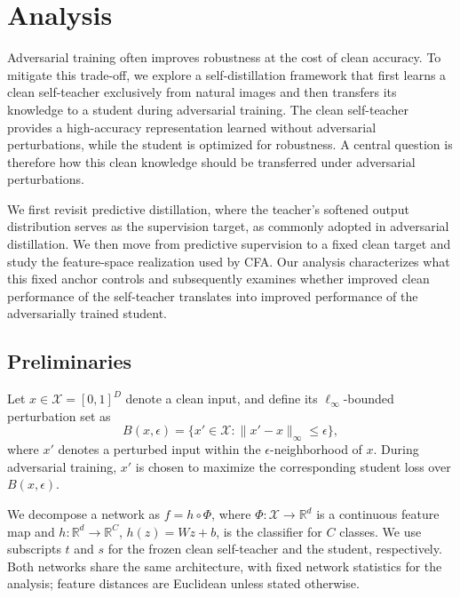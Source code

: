 \section{Analysis}
\label{sec:analysis}

Adversarial training often improves robustness at the cost of clean accuracy.
To mitigate this trade-off, we explore a self-distillation framework that
first learns a clean self-teacher exclusively from natural images and then
transfers its knowledge to a student during adversarial training.
The clean self-teacher provides a high-accuracy representation learned without
adversarial perturbations, while the student is optimized for robustness.
A central question is therefore how this clean knowledge should be transferred
under adversarial perturbations.

We first revisit predictive distillation, where the teacher's softened output
distribution serves as the supervision target, as commonly adopted in
adversarial distillation.
We then move from predictive supervision to a fixed clean target and study the
feature-space realization used by CFA.
Our analysis characterizes what this fixed anchor controls and subsequently
examines whether improved clean performance of the self-teacher translates
into improved performance of the adversarially trained student.


\subsection{Preliminaries}

Let \(x\in\mathcal X=[0,1]^D\) denote a clean input, and define its
\(\ell_\infty\)-bounded perturbation set as
\begin{equation}
B(x,\epsilon)
=
\{x'\in\mathcal X:
\lVert x'-x\rVert_\infty\le\epsilon\},
\end{equation}
where \(x'\) denotes a perturbed input within the \(\epsilon\)-neighborhood
of \(x\).
During adversarial training, \(x'\) is chosen to maximize the corresponding
student loss over \(B(x,\epsilon)\).

We decompose a network as \(f=h\circ\Phi\), where
\(\Phi:\mathcal X\to\mathbb R^d\) is a continuous feature map and
\(h:\mathbb R^d\to\mathbb R^C\), \(h(z)=Wz+b\), is the classifier for
\(C\) classes.
We use subscripts \(t\) and \(s\) for the frozen clean self-teacher and the
student, respectively.
Both networks share the same architecture, with fixed network statistics for
the analysis; feature distances are Euclidean unless stated otherwise.


